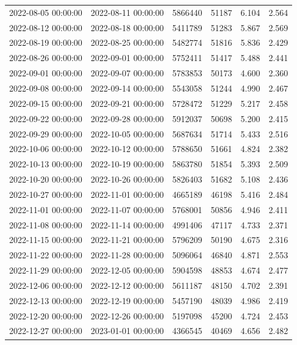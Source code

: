 \begin{tabular}{llrrrr}
2022-08-05 00:00:00 & 2022-08-11 00:00:00 & 5866440 & 51187 & 6.104 & 2.564 \\
2022-08-12 00:00:00 & 2022-08-18 00:00:00 & 5411789 & 51283 & 5.867 & 2.569 \\
2022-08-19 00:00:00 & 2022-08-25 00:00:00 & 5482774 & 51816 & 5.836 & 2.429 \\
2022-08-26 00:00:00 & 2022-09-01 00:00:00 & 5752411 & 51417 & 5.488 & 2.441 \\
2022-09-01 00:00:00 & 2022-09-07 00:00:00 & 5783853 & 50173 & 4.600 & 2.360 \\
2022-09-08 00:00:00 & 2022-09-14 00:00:00 & 5543058 & 51244 & 4.990 & 2.467 \\
2022-09-15 00:00:00 & 2022-09-21 00:00:00 & 5728472 & 51229 & 5.217 & 2.458 \\
2022-09-22 00:00:00 & 2022-09-28 00:00:00 & 5912037 & 50698 & 5.200 & 2.415 \\
2022-09-29 00:00:00 & 2022-10-05 00:00:00 & 5687634 & 51714 & 5.433 & 2.516 \\
2022-10-06 00:00:00 & 2022-10-12 00:00:00 & 5788650 & 51661 & 4.824 & 2.382 \\
2022-10-13 00:00:00 & 2022-10-19 00:00:00 & 5863780 & 51854 & 5.393 & 2.509 \\
2022-10-20 00:00:00 & 2022-10-26 00:00:00 & 5826403 & 51682 & 5.108 & 2.436 \\
2022-10-27 00:00:00 & 2022-11-01 00:00:00 & 4665189 & 46198 & 5.416 & 2.484 \\
2022-11-01 00:00:00 & 2022-11-07 00:00:00 & 5768001 & 50856 & 4.946 & 2.411 \\
2022-11-08 00:00:00 & 2022-11-14 00:00:00 & 4991406 & 47117 & 4.733 & 2.371 \\
2022-11-15 00:00:00 & 2022-11-21 00:00:00 & 5796209 & 50190 & 4.675 & 2.316 \\
2022-11-22 00:00:00 & 2022-11-28 00:00:00 & 5096064 & 46840 & 4.871 & 2.553 \\
2022-11-29 00:00:00 & 2022-12-05 00:00:00 & 5904598 & 48853 & 4.674 & 2.477 \\
2022-12-06 00:00:00 & 2022-12-12 00:00:00 & 5611187 & 48150 & 4.702 & 2.391 \\
2022-12-13 00:00:00 & 2022-12-19 00:00:00 & 5457190 & 48039 & 4.986 & 2.419 \\
2022-12-20 00:00:00 & 2022-12-26 00:00:00 & 5197098 & 45200 & 4.724 & 2.453 \\
2022-12-27 00:00:00 & 2023-01-01 00:00:00 & 4366545 & 40469 & 4.656 & 2.482 \\

\end{tabular}

